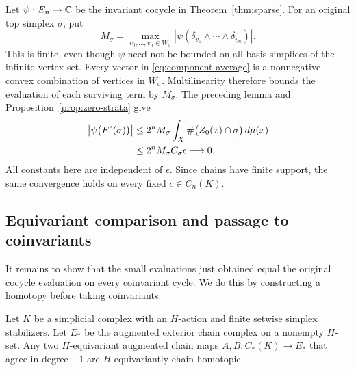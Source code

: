Let $\psi:E_n\to\mathbb C$ be the invariant cocycle in
Theorem~\ref{thm:sparse}. For an original top simplex $\sigma$, put
\[
 M_\sigma=
 \max_{v_0,\ldots,v_n\in W_\sigma}
 \left|\psi(\delta_{v_0}\wedge\cdots\wedge\delta_{v_n})\right|.
\]
This is finite, even though $\psi$ need not be bounded on all
basis simplices of the infinite vertex set. Every vector in
\eqref{eq:component-average} is a nonnegative convex combination
of vertices in $W_\sigma$. Multilinearity therefore bounds the
evaluation of each surviving term by $M_\sigma$. The preceding
lemma and Proposition~\ref{prop:zero-strata} give
\begin{align}
 \left|\psi\bigl(F^\epsilon(\sigma)\bigr)\right|
 &\leq 2^n M_\sigma
 \int_X\#\bigl(Z_0(x)\cap\sigma\bigr)\,d\mu(x)
 \notag\\
 &\leq 2^n M_\sigma C_\sigma\epsilon
 \longrightarrow 0.\label{eq:small-chain-evaluation}
\end{align}
All constants here are independent of $\epsilon$. Since chains
have finite support, the same convergence holds on every fixed
$c\in C_n(K)$.

\subsection{Equivariant comparison and passage to coinvariants}

It remains to show that the small evaluations just obtained equal
the original cocycle evaluation on every coinvariant cycle.
We do this by constructing a homotopy before taking coinvariants.

\begin{lemma}\label{lem:equivariant-homotopy}
Let $K$ be a simplicial complex with an $H$-action and finite
setwise simplex stabilizers. Let $E_*$ be the augmented exterior
chain complex on a nonempty $H$-set. Any two $H$-equivariant
augmented chain maps $A,B:C_*(K)\to E_*$ that agree in degree $-1$
are $H$-equivariantly chain homotopic.
\end{lemma}

